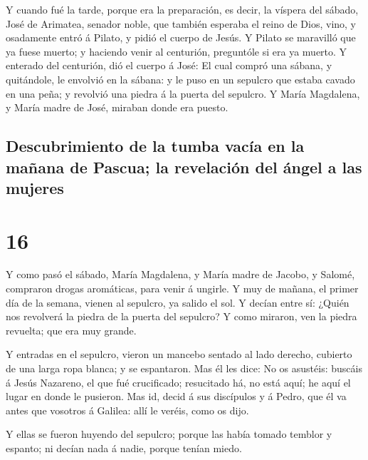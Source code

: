  Y cuando fué la tarde, porque era la preparación, es
decir, la víspera del sábado,  José de Arimatea, senador
noble, que también esperaba el reino de Dios, vino, y osadamente entró á
Pilato, y pidió el cuerpo de Jesús.  Y Pilato se
maravilló que ya fuese muerto; y haciendo venir al centurión, preguntóle
si era ya muerto.  Y enterado del centurión, dió el
cuerpo á José:  El cual compró una sábana, y quitándole,
le envolvió en la sábana: y le puso en un sepulcro que estaba cavado en
una peña; y revolvió una piedra á la puerta del sepulcro.
 Y María Magdalena, y María madre de José, miraban donde
era puesto.

\hypertarget{descubrimiento-de-la-tumba-vacuxeda-en-la-mauxf1ana-de-pascua-la-revelaciuxf3n-del-uxe1ngel-a-las-mujeres}{%
\subsection{Descubrimiento de la tumba vacía en la mañana de Pascua; la
revelación del ángel a las
mujeres}\label{descubrimiento-de-la-tumba-vacuxeda-en-la-mauxf1ana-de-pascua-la-revelaciuxf3n-del-uxe1ngel-a-las-mujeres}}

\hypertarget{section-15}{%
\section{16}\label{section-15}}

 Y como pasó el sábado, María Magdalena, y María madre de
Jacobo, y Salomé, compraron drogas aromáticas, para venir á ungirle.
 Y muy de mañana, el primer día de la semana, vienen al
sepulcro, ya salido el sol.  Y decían entre sí: ¿Quién nos
revolverá la piedra de la puerta del sepulcro?  Y como
miraron, ven la piedra revuelta; que era muy grande.

 Y entradas en el sepulcro, vieron un mancebo sentado al
lado derecho, cubierto de una larga ropa blanca; y se espantaron.
 Mas él les dice: No os asustéis: buscáis á Jesús
Nazareno, el que fué crucificado; resucitado há, no está aquí; he aquí
el lugar en donde le pusieron.  Mas id, decid á sus
discípulos y á Pedro, que él va antes que vosotros á Galilea: allí le
veréis, como os dijo.

 Y ellas se fueron huyendo del sepulcro; porque las había
tomado temblor y espanto; ni decían nada á nadie, porque tenían miedo.

